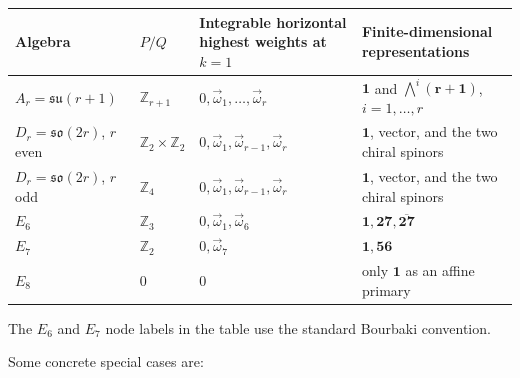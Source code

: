 \documentclass[
  10pt,
  a4paper,
  openany]{book}
\begin{document}
\begin{longtable}[]{@{}
  >{\raggedright\arraybackslash}p{}
  >{\raggedleft\arraybackslash}p{}
  >{\raggedright\arraybackslash}p{}
  >{\raggedright\arraybackslash}p{}@{}}
\toprule\noalign{}
\begin{minipage}[b]{\linewidth}\raggedright
Algebra
\end{minipage} & \begin{minipage}[b]{\linewidth}\raggedleft
\(P/Q\)
\end{minipage} & \begin{minipage}[b]{\linewidth}\raggedright
Integrable horizontal highest weights at \(k=1\)
\end{minipage} & \begin{minipage}[b]{\linewidth}\raggedright
Finite-dimensional representations
\end{minipage} \\
\midrule\noalign{}
\endhead
\bottomrule\noalign{}
\endlastfoot
\(A_r=\mathfrak{su}(r+1)\) & \(\mathbb Z_{r+1}\) &
\(0,\vec\omega_1,\ldots,\vec\omega_r\) & \(\mathbf 1\) and
\(\bigwedge^i\mathbf{(r+1)}\), \(i=1,\ldots,r\) \\
\(D_r=\mathfrak{so}(2r)\), \(r\) even & \(\mathbb Z_2\times\mathbb Z_2\)
& \(0,\vec\omega_1,\vec\omega_{r-1},\vec\omega_r\) & \(\mathbf 1\),
vector, and the two chiral spinors \\
\(D_r=\mathfrak{so}(2r)\), \(r\) odd & \(\mathbb Z_4\) &
\(0,\vec\omega_1,\vec\omega_{r-1},\vec\omega_r\) & \(\mathbf 1\),
vector, and the two chiral spinors \\
\(E_6\) & \(\mathbb Z_3\) & \(0,\vec\omega_1,\vec\omega_6\) &
\(\mathbf 1,\mathbf{27},\overline{\mathbf{27}}\) \\
\(E_7\) & \(\mathbb Z_2\) & \(0,\vec\omega_7\) &
\(\mathbf 1,\mathbf{56}\) \\
\(E_8\) & \(0\) & \(0\) & only \(\mathbf 1\) as an affine primary \\
\end{longtable}

The \(E_6\) and \(E_7\) node labels in the table use the standard
Bourbaki convention.

Some concrete special cases are:
\end{document}
